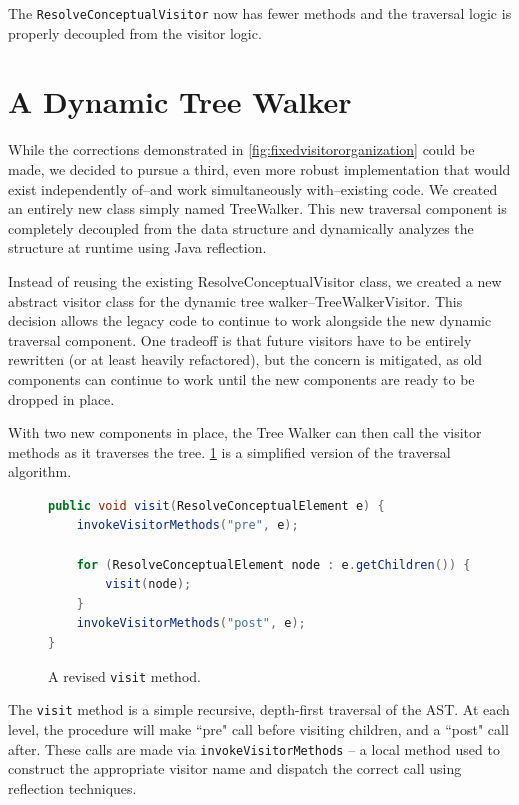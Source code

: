 \documentclass[times]{speauth}
\begin{document}
The \texttt{ResolveConceptualVisitor} now has fewer methods and the traversal logic is properly decoupled from the visitor logic.


\section{A Dynamic Tree Walker}
While the corrections demonstrated in \ref{fig:fixedvisitororganization} could be made, we decided to pursue a third, even more robust implementation that would exist independently of--and work simultaneously with--existing code. We created an entirely new class simply named TreeWalker. This new traversal component is completely decoupled from the data structure and dynamically analyzes the structure at runtime using Java reflection.

Instead of reusing the existing ResolveConceptualVisitor class, we created a new abstract visitor class for the dynamic tree walker--TreeWalkerVisitor. This decision allows the legacy code to continue to work alongside the new dynamic traversal component. One tradeoff is that future visitors have to be entirely rewritten (or at least heavily refactored), but the concern is mitigated, as old components can continue to work until the new components are ready to be dropped in place.

With two new components in place, the Tree Walker can then call the visitor methods as it traverses the tree. \ref{fig:newvisit} is a simplified version of the traversal algorithm.

\begin{figure}[!htb]
\centering
\begin{minipage}{.80\textwidth}
\begin{lstlisting}[language=java]
public void visit(ResolveConceptualElement e) {
    invokeVisitorMethods("pre", e);
    
    for (ResolveConceptualElement node : e.getChildren()) {
        visit(node);
    }
    invokeVisitorMethods("post", e);
}
\end{lstlisting}
\end{minipage}
\caption{A revised \texttt{visit} method.}
\label{fig:newvisit}
\end{figure}

The \texttt{visit} method is a simple recursive, depth-first traversal of the AST. At each level, the procedure will make ``pre" call before visiting children, and a ``post" call after. These calls are made via \texttt{invokeVisitorMethods} -- a local method used to construct the appropriate visitor name and dispatch the correct call using reflection techniques.
\end{document}
